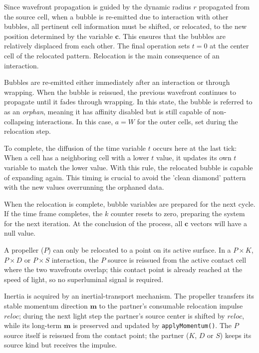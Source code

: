 \documentclass{ijuc}
\begin{document}
Since wavefront propagation is guided by the dynamic radius $r$ propagated from the source cell, when a bubble is re-emitted due to interaction with other bubbles, all pertinent cell information must be shifted, or relocated, to the new position determined by the variable $\textbf{c}$. 
This ensures that the bubbles are relatively displaced from each other. 
The final operation sets $t=0$ at the center cell of the relocated pattern. 
Relocation is the main consequence of an interaction.

Bubbles are re-emitted either immediately after an interaction or through wrapping. 
When the bubble is reissued, the previous wavefront continues to propagate until it fades through wrapping. 
In this state, the bubble is referred to as an \textit{orphan}, meaning it has affinity disabled but is still capable of non-collapsing interactions. 
In this case, $a=W$ for the outer cells, set during the relocation step. 

To complete, the diffusion of the time variable $t$ occurs here at the last tick: When a cell has a neighboring cell with a lower $t$ value, it updates its own $t$ variable to match the lower value. 
With this rule, the relocated bubble is capable of expanding again. 
This timing is crucial to avoid the 'clean diamond' pattern with the new values overrunning the orphaned data.

When the relocation is complete, bubble variables are prepared for the next cycle. 
If the time frame completes, the $k$ counter resets to zero, preparing the system for the next iteration.  
At the conclusion of the process, all $\boldsymbol{c}$ vectors will have a null value.

A propeller ($P$) can only be relocated to a point on its active surface. In a $P \times K$, $P \times D$ or $P \times S$ interaction, the $P$ source is reissued from the active contact cell where the two wavefronts overlap; this contact point is already reached at the speed of light, so no superluminal signal is required.

Inertia is acquired by an inertial-transport mechanism. The propeller transfers its stable momentum direction $\boldsymbol{m}$ to the partner's consumable relocation impulse $\boldsymbol{\mathit{reloc}}$; during the next light step the partner's source center is shifted by $\boldsymbol{\mathit{reloc}}$, while its long-term $\boldsymbol{m}$ is preserved and updated by \texttt{applyMomentum()}.
The $P$ source itself is reissued from the contact point; the partner ($K$, $D$ or $S$) keeps its source kind but receives the impulse.
\end{document}
